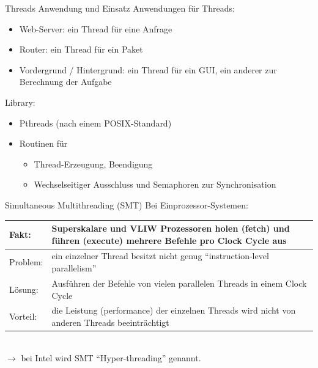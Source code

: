 \begin{example}{Threads Anwendung und Einsatz}
    Anwendungen für Threads:
    \begin{itemize}
        \item Web-Server: ein Thread für eine Anfrage
        \item Router: ein Thread für ein Paket
        \item Vordergrund / Hintergrund: ein Thread für ein GUI,
              ein anderer zur Berechnung der Aufgabe
    \end{itemize}
    Library:
    \begin{itemize}
        \item Pthreads (nach einem POSIX-Standard)
        \item Routinen für
              \begin{itemize}
                  \item Thread-Erzeugung, Beendigung
                  \item Wechselseitiger Ausschluss und Semaphoren zur Synchronisation
              \end{itemize}
    \end{itemize}
\end{example}

\begin{defi}[Threads]{Simultaneous Multithreading (SMT)}
    Bei Einprozessor-Systemen: \\
    \begin{tabularx}{\textwidth}{|l|X|}
        \hline
        Fakt:    & Superskalare und VLIW Prozessoren holen (fetch) und führen (execute) mehrere Befehle pro Clock Cycle aus \\
        \hline
        Problem: & ein einzelner Thread besitzt nicht genug \enquote{instruction-level parallelism}                         \\
        \hline
        Lösung:  & Ausführen der Befehle von vielen parallelen Threads in einem Clock Cycle                                 \\
        \hline
        Vorteil: & die Leistung (performance) der einzelnen Threads wird nicht von anderen Threads beeinträchtigt           \\
        \hline
    \end{tabularx}
    \\
    $\to$ bei Intel wird SMT \enquote{Hyper-threading} genannt.
\end{defi}